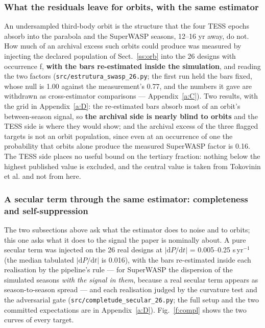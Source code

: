 \documentclass{aa}
\begin{document}
\subsubsection{What the residuals leave for orbits, with the same estimator}\label{sss:orbitas}
An undersampled third-body orbit is the structure that the four TESS epochs absorb into the parabola and the SuperWASP seasons, 12--16 yr away, do not. How much of an archival excess such orbits could produce was measured by injecting the declared population of Sect.~\ref{ss:orb} into the 26 designs with occurrence f, \textbf{with the bars re-estimated inside the simulation}, and reading the two factors (\texttt{src/\allowbreak estrutura\_\allowbreak swasp\_\allowbreak 26.py}; the first run held the bars fixed, whose null is 1.00 against the measurement's 0.77, and the numbers it gave are withdrawn as cross-estimator comparisons --- Appendix~\ref{a:C}). Two results, with the grid in Appendix~\ref{a:D}: the re-estimated bars absorb most of an orbit's between-season signal, so \textbf{the archival side is nearly blind to orbits} and the TESS side is where they would show; and the archival excess of the three flagged targets is not an orbit population, since even at an occurrence of one the probability that orbits alone produce the measured SuperWASP factor is 0.16. The TESS side places no useful bound on the tertiary fraction: nothing below the highest published value is excluded, and the central value is taken from Tokovinin et al. and not from here.


\subsubsection{A secular term through the same estimator: completeness and self-suppression}\label{sss:secular}
The two subsections above ask what the estimator does to noise and to orbits; this one asks what it does to the signal the paper is nominally about. A pure secular term was injected on the 26 real designs at $|\mathrm{d}P/\mathrm{d}t|$ = 0.005--0.25 s\,yr$^{-1}$ (the median tabulated $|\mathrm{d}P/\mathrm{d}t|$ is 0.016), with the bars re-estimated inside each realisation by the pipeline's rule --- for SuperWASP the dispersion of the simulated seasons \textit{with the signal in them}, because a real secular term appears as season-to-season spread --- and each realisation judged by the curvature test and the adversarial gate (\texttt{src/\allowbreak completude\_\allowbreak secular\_\allowbreak 26.py}; the full setup and the two committed expectations are in Appendix~\ref{a:D}). Fig.~\ref{f:compl} shows the two curves of every target.
\end{document}
